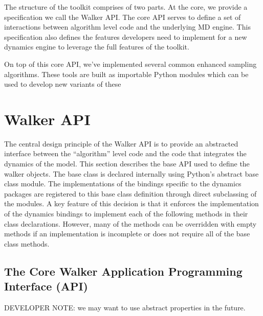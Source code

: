 \documentclass[letterpaper,10pt,english]{sphinxmanual}
\begin{document}
The structure of the toolkit comprises of two parts. At the core, we provide a specification we call the Walker API. The core API serves to define a set of interactions between algorithm level code and the underlying MD engine. This specification also defines the features developers need to implement for a new dynamics engine to leverage the full features of the toolkit.

On top of this core API, we've implemented several common enhanced sampling algorithms. These tools are built as importable Python modules which can be used to develop new variants of these


\chapter{Walker API}
\label{walker_api/walker_api.doc::doc}\label{walker_api/walker_api.doc:walker-api}
The central design principle of the Walker API is to provide an
abstracted interface between the ``algorithm'' level code and the
code that integrates the dynamics of the model. This section describes the base API used to define the walker objects. The base class is declared internally using Python's abstract base class module. The implementations of the bindings specific to the dynamics packages are registered to this base class definition through direct subclassing of the modules. A key feature of this decision is that it enforces the implementation of the dynamics bindings to implement each of the following methods in their class declarations. However, many of the methods can be overridden with empty methods if an implementation is incomplete or does not require all of the base class methods.


\section{The Core Walker Application Programming Interface (API)}
\label{walker_api/walker_api.doc:module-walker_base}\label{walker_api/walker_api.doc:the-core-walker-application-programming-interface-api}
DEVELOPER NOTE: we may want to use abstract properties in the future.
\end{document}
